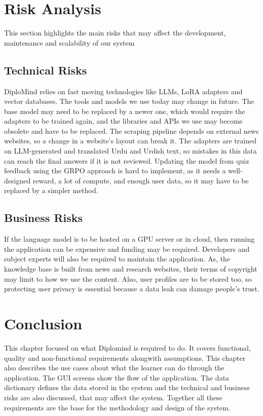 \documentclass{FastFyp}
\begin{document}
\FloatBarrier
\section{ Risk Analysis}
This section highlights the main risks that may affect the development, maintenance and scalability of our system
\subsection{Technical Risks}
DiploMind relies on fast moving technologies like LLMs, LoRA adapters and vector databases. The tools and models we use today may change in future. The base model may need to be replaced by a newer one, which would require the adapters to be trained again, and the libraries and APIs we use may become obsolete and have to be replaced. The scraping pipeline depends on external news websites, so a change in a website's layout can break it. The adapters are trained on LLM-generated and translated Urdu and Urdish text, so mistakes in this data can reach the final answers if it is not reviewed. Updating the model from quiz feedback using the GRPO approach is hard to implement, as it needs a well-designed reward, a lot of compute, and enough user data, so it may have to be replaced by a simpler method. 

\subsection{Business Risks}
If the language model is to be hosted on a GPU server or in cloud, then running the application can be expensive and funding may be required. Developers and subject experts will also be required to maintain the application. As, the knowledge base is built from news and research websites, their terms of copyright may limit to how we use the content. Also, user profiles are to be stored too, so protecting user privacy is essential because a data leak can damage people's trust.

\section{Conclusion}
This chapter focused on what Diplomind is required to do. It covers functional, quality and non-functional requirements alongwith assumptions. This chapter also describes the use cases about what the learner can do through the application. The GUI screens show the flow of the application. The data dictionary defines the data stored in the system and the technical and business risks are also discussed, that may affect the system. Together all these requirements are the base for the methodology and design of the system.
\end{document}
